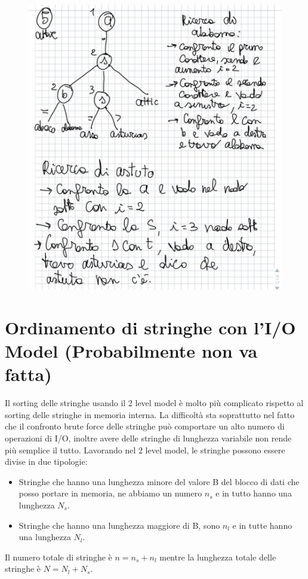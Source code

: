 \documentclass[14pt]{extreport}
\begin{document}
\begin{figure}[H]
\centering
  \includegraphics[width=0.85\linewidth]{Es2Trie.jpg}
\end{figure}
\newpage
\section{Ordinamento di stringhe con l'I/O Model (Probabilmente non va fatta)}

Il sorting delle stringhe usando il 2 level model è molto più complicato rispetto al sorting delle stringhe in memoria interna.
La difficoltà sta soprattutto nel fatto che il confronto brute force delle stringhe può comportare un alto numero di operazioni di I/O, inoltre avere delle stringhe di lunghezza variabile non rende più semplice il tutto.
Lavorando nel 2 level model, le stringhe possono essere divise in due tipologie:
\begin{itemize}
\item Stringhe che hanno una lunghezza minore del valore B del blocco di dati che posso portare in memoria, ne abbiamo un numero $n_s$ e in tutto hanno una lunghezza $N_s$.
\item Stringhe che hanno una lunghezza maggiore di B, sono $n_l$ e in tutte hanno una lunghezza $N_l$.
\end{itemize}
Il numero totale di stringhe è $n=n_s+n_l$ mentre la lunghezza totale delle stringhe è $N = N_l + N_s$.
\end{document}
